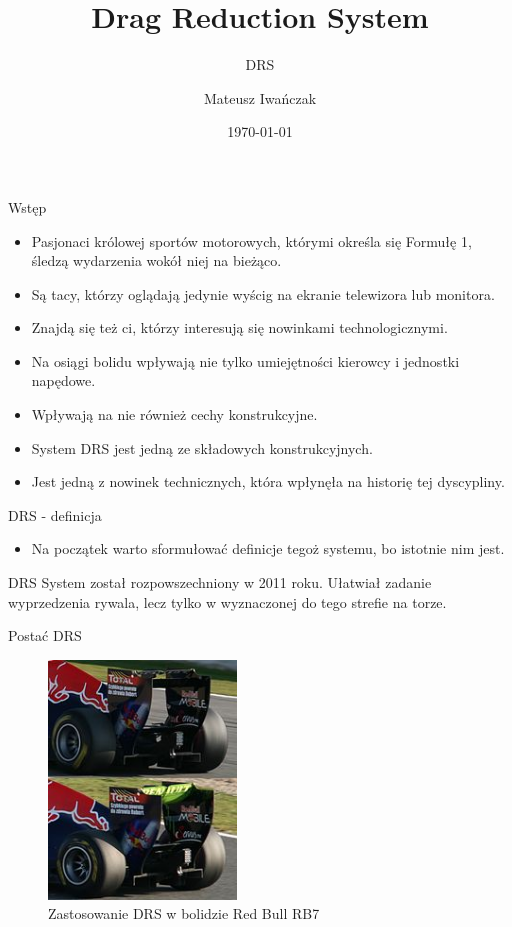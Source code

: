 \documentclass{beamer}
\title{Drag Reduction System}
\subtitle{DRS}
\author{Mateusz Iwańczak}
\date{\today}
\begin{document}
\begin{frame}
\titlepage
\end{frame}

\begin{frame}{Wstęp}
\centering
\begin{itemize}
\item Pasjonaci królowej sportów motorowych, którymi określa się Formułę 1, śledzą wydarzenia wokół niej na bieżąco.
\item Są tacy, którzy oglądają jedynie wyścig na ekranie telewizora lub monitora.
\item Znajdą się też ci, którzy interesują się nowinkami technologicznymi.
\item Na osiągi bolidu wpływają nie tylko umiejętności kierowcy i jednostki napędowe.
\item Wpływają na nie również cechy konstrukcyjne.
\item System DRS jest jedną ze składowych konstrukcyjnych.
\item Jest jedną z nowinek technicznych, która wpłynęła na historię tej dyscypliny.
\end{itemize}
\end{frame}

\begin{frame}{DRS - definicja}
\centering
\begin{itemize}
\item Na początek warto sformułować definicje tegoż systemu, bo istotnie nim jest.
\end{itemize}
\begin{block}{DRS}
System został rozpowszechniony w 2011 roku. Ułatwiał zadanie wyprzedzenia rywala, lecz tylko w wyznaczonej do tego strefie na torze.
\end{block}
\end{frame}

\begin{frame}{Postać DRS}
\begin{figure}[h]
\centering
\includegraphics[width=5cm]{./images/DRS3}
\caption[1]{Zastosowanie DRS w bolidzie Red Bull RB7}
\end{figure}
\end{frame}
\end{document}
